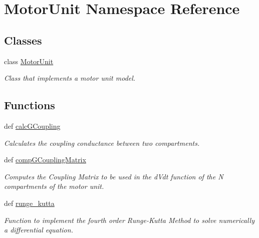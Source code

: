 \hypertarget{namespace_motor_unit}{\section{Motor\-Unit Namespace Reference}
\label{namespace_motor_unit}
}
\subsection*{Classes}
\begin{DoxyCompactItemize}
\item 
class \hyperlink{class_motor_unit_1_1_motor_unit}{Motor\-Unit}
\begin{DoxyCompactList}\small\item\em Class that implements a motor unit model. \end{DoxyCompactList}\end{DoxyCompactItemize}
\subsection*{Functions}
\begin{DoxyCompactItemize}
\item 
def \hyperlink{namespace_motor_unit_a232c5f6b9bf5b3e04a26c5e8ff0bda57}{calc\-G\-Coupling}
\begin{DoxyCompactList}\small\item\em Calculates the coupling conductance between two compartments. \end{DoxyCompactList}\item 
def \hyperlink{namespace_motor_unit_aa8a5016f6b73726a88d8fdcf0c8ec9e5}{comp\-G\-Coupling\-Matrix}
\begin{DoxyCompactList}\small\item\em Computes the Coupling Matrix to be used in the d\-Vdt function of the N compartments of the motor unit. \end{DoxyCompactList}\item 
def \hyperlink{namespace_motor_unit_ad34c81597ff5e9cdcf53fd13e78d2d6c}{runge\-\_\-kutta}
\begin{DoxyCompactList}\small\item\em Function to implement the fourth order Runge-\/\-Kutta Method to solve numerically a differential equation. \end{DoxyCompactList}\end{DoxyCompactItemize}


